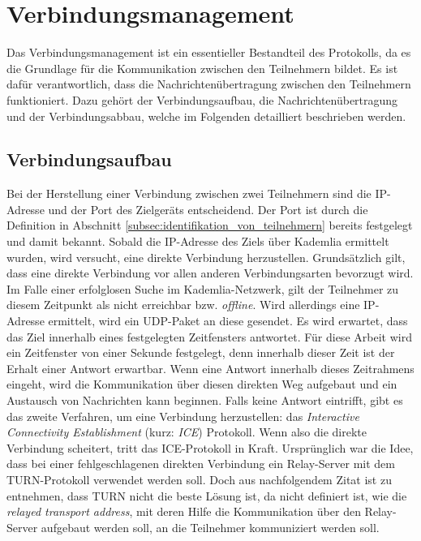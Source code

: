 \section{Verbindungsmanagement}
\label{subsec:verbindungsmanagement}

Das Verbindungsmanagement ist ein essentieller Bestandteil des Protokolls, da es die Grundlage für die Kommunikation zwischen den Teilnehmern bildet. Es ist dafür verantwortlich, dass die Nachrichtenübertragung zwischen den Teilnehmern funktioniert. Dazu gehört der Verbindungsaufbau, die Nachrichtenübertragung und der Verbindungsabbau, welche im Folgenden detailliert beschrieben werden.

\subsection{Verbindungsaufbau}
\label{label:verbindungsaufbau}

Bei der Herstellung einer Verbindung zwischen zwei Teilnehmern sind die IP-Adresse und der Port des Zielgeräts entscheidend. Der Port ist durch die Definition in Abschnitt \ref{subsec:identifikation_von_teilnehmern} bereits festgelegt und damit bekannt. Sobald die IP-Adresse des Ziels über Kademlia ermittelt wurden, wird versucht, eine direkte Verbindung herzustellen. Grundsätzlich gilt, dass eine direkte Verbindung vor allen anderen Verbindungsarten bevorzugt wird. Im Falle einer erfolglosen Suche im Kademlia-Netzwerk, gilt der Teilnehmer zu diesem Zeitpunkt als nicht erreichbar bzw. \textit{offline}. Wird allerdings eine IP-Adresse ermittelt, wird ein UDP-Paket an diese gesendet. Es wird erwartet, dass das Ziel innerhalb eines festgelegten Zeitfensters antwortet. Für diese Arbeit wird ein Zeitfenster von einer Sekunde festgelegt, denn innerhalb dieser Zeit ist der Erhalt einer Antwort erwartbar. Wenn eine Antwort innerhalb dieses Zeitrahmens eingeht, wird die Kommunikation über diesen direkten Weg aufgebaut und ein Austausch von Nachrichten kann beginnen. Falls keine Antwort eintrifft, gibt es das zweite Verfahren, um eine Verbindung herzustellen: das \textit{Interactive Connectivity Establishment} (kurz: \textit{ICE}) Protokoll. Wenn also die direkte Verbindung scheitert, tritt das ICE-Protokoll in Kraft.
Ursprünglich war die Idee, dass bei einer fehlgeschlagenen direkten Verbindung ein Relay-Server mit dem TURN-Protokoll verwendet werden soll. Doch aus nachfolgendem Zitat ist zu entnehmen, dass TURN nicht die beste Lösung ist, da nicht definiert ist, wie die \textit{relayed transport address}, mit deren Hilfe die Kommunikation über den Relay-Server aufgebaut werden soll, an die Teilnehmer kommuniziert werden soll.

